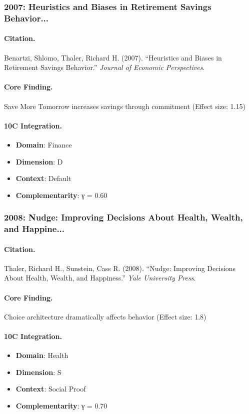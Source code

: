 \subsubsection{2007: Heuristics and Biases in Retirement Savings Behavior...}

\paragraph{Citation.}
Benartzi, Shlomo, Thaler, Richard H. (2007). ``Heuristics and Biases in Retirement Savings Behavior.''
\textit{Journal of Economic Perspectives}.

\paragraph{Core Finding.}
Save More Tomorrow increases savings through commitment (Effect size: 1.15)

\paragraph{10C Integration.}
\begin{itemize}[nosep]
  \item \textbf{Domain}: Finance
  \item \textbf{Dimension}: D
  \item \textbf{Context}: Default
  \item \textbf{Complementarity}: γ = 0.60
\end{itemize}

\subsubsection{2008: Nudge: Improving Decisions About Health, Wealth, and Happine...}

\paragraph{Citation.}
Thaler, Richard H., Sunstein, Cass R. (2008). ``Nudge: Improving Decisions About Health, Wealth, and Happiness.''
\textit{Yale University Press}.

\paragraph{Core Finding.}
Choice architecture dramatically affects behavior (Effect size: 1.8)

\paragraph{10C Integration.}
\begin{itemize}[nosep]
  \item \textbf{Domain}: Health
  \item \textbf{Dimension}: S
  \item \textbf{Context}: Social Proof
  \item \textbf{Complementarity}: γ = 0.70
\end{itemize}


